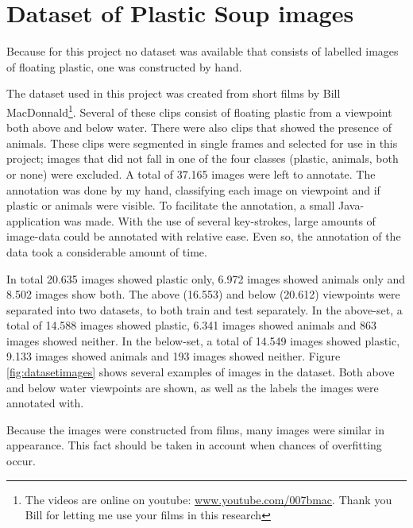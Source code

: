 \section{Dataset of Plastic Soup images}
\label{sec:Data}
Because for this project no dataset was available that consists of labelled images of floating plastic, one was constructed by hand.

The dataset used in this project was created from short films by Bill MacDonnald\footnote{The videos are online on youtube: \url{www.youtube.com/007bmac}. Thank you Bill for letting me use your films in this research}.
Several of these clips consist of floating plastic from a viewpoint both above and below water.
There were also clips that showed the presence of animals.
These clips were segmented in single frames and selected for use in this project; images that did not fall in one of the four classes (plastic, animals, both or none) were excluded.
A total of 37.165 images were left to annotate.
The annotation was done by my hand, classifying each image on viewpoint and if plastic or animals were visible.
To facilitate the annotation, a small Java-application was made.
With the use of several key-strokes, large amounts of image-data could be annotated with relative ease.
Even so, the annotation of the data took a considerable amount of time.

In total 20.635 images showed plastic only, 6.972 images showed animals only and 8.502 images show both.
The above (16.553) and below (20.612) viewpoints were separated into two datasets, to both train and test separately. 
In the above-set, a total of 14.588 images showed plastic, 6.341 images showed animals and 863 images showed neither. In the below-set, a total of 14.549 images showed plastic, 9.133 images showed animals and 193 images showed neither.
Figure \ref{fig:datasetimages} shows several examples of images in the dataset.
Both above and below water viewpoints are shown, as well as the labels the images were annotated with.

Because the images were constructed from films, many images were similar in appearance.
This fact should be taken in account when chances of overfitting occur.

